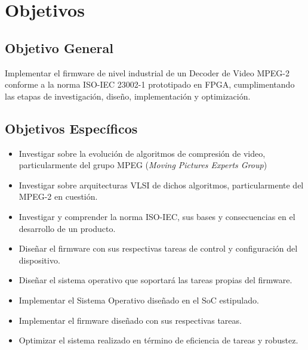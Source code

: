 
\section{Objetivos}
\label{sec:obj}

\subsection{Objetivo General}
\label{sec:obj-gen}
Implementar el firmware de nivel industrial de un Decoder de Video MPEG-2 conforme a la norma ISO-IEC 23002-1 prototipado en FPGA, cumplimentando las etapas de investigación, diseño, implementación y optimización.
\subsection{Objetivos Específicos}
\label{sec:objet-espec}
\begin{itemize}
\item Investigar sobre la evolución de algoritmos de compresión de video, particularmente del grupo MPEG (\textit{Moving Pictures Experts Group})
\item Investigar sobre arquitecturas VLSI de dichos algoritmos, particularmente del MPEG-2 en cuestión.
\item Investigar y comprender la norma ISO-IEC, sus bases y consecuencias en el desarrollo de un producto.
\item Diseñar el firmware con sus respectivas tareas de control y configuración del dispositivo.
\item Diseñar el sistema operativo que soportará las tareas propias del firmware.
\item Implementar el Sistema Operativo diseñado en el SoC estipulado.
\item Implementar el firmware diseñado con sus respectivas tareas.
\item Optimizar el sistema realizado en término de eficiencia de tareas y robustez. 
\end{itemize}

